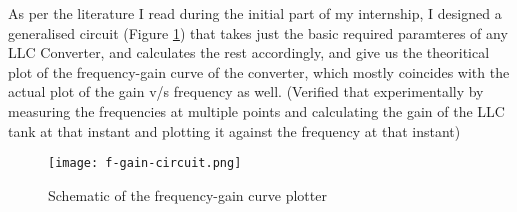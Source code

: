 As per the literature I read during the initial part of my internship, I designed a generalised circuit (Figure \ref*{fig:f-gain-circuit}) that takes just the basic required paramteres of any LLC Converter, and calculates the rest accordingly, and give us the theoritical plot of the frequency-gain curve of the converter, which mostly coincides with the actual plot of the gain v/s frequency as well. (Verified that experimentally by measuring the frequencies at multiple points and calculating the gain of the LLC tank at that instant and plotting it against the frequency at that instant)
\begin{figure}[H]
    \centering
    \texttt{[image: f-gain-circuit.png]}
    \caption{Schematic of the frequency-gain curve plotter}
    \label{fig:f-gain-circuit}
\end{figure}


